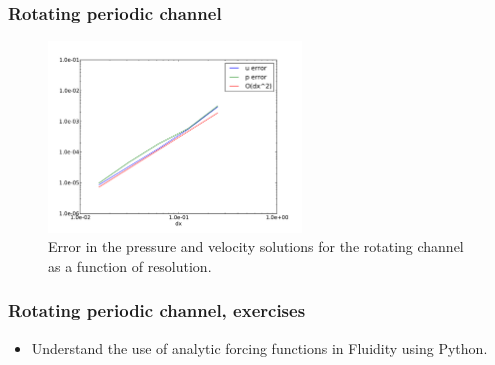 \begin{frame}
    \frametitle{Rotating periodic channel}
\begin{figure}
\includegraphics[width=0.6\textwidth]{./rotating_channel/convergence}
\caption{Error in the pressure and velocity solutions for the rotating channel as a function of resolution.}
\end{figure}
\end{frame}
%
\begin{frame}
    \frametitle{Rotating periodic channel, exercises}
\begin{itemize}
\item Understand the use of analytic forcing functions in Fluidity using Python.
\end{itemize}
\end{frame}

